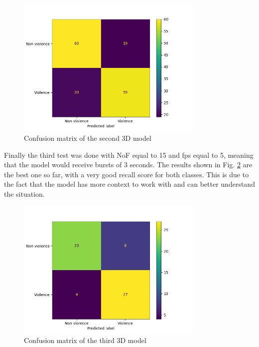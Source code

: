 \begin{figure}[]
    \centering
    \includegraphics[width=0.8\textwidth]{images/ce07-testGiacomo3D3-9fcf-conf_matrix.png}
    \caption{Confusion matrix of the second 3D model}
    \label{fig:Second3DCNNconfusionMatrix}
\end{figure}

Finally the third test was done with NoF equal to 15 and fps equal to 5, meaning that the model would receive bursts of 3 seconds.  The results shown in Fig. \ref{fig:Third3DCNNconfusionMatrix} are the best one so far, with a very good recall score for both classes. This is due to the fact that the model has more context to work with and can better understand the situation.


\begin{figure}[]
    \centering
    \includegraphics[width=0.8\textwidth]{images/71d5-testGiacomo3D3-9fcf-conf_matrix.png}
    \caption{Confusion matrix of the third 3D model}
    \label{fig:Third3DCNNconfusionMatrix}
\end{figure}



